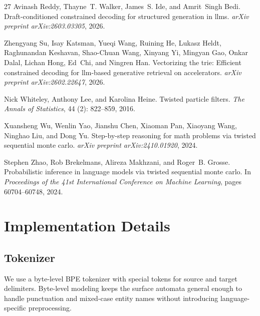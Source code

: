 \documentclass[11pt]{article}
\begin{document}
\begin{thebibliography}{27}
Avinash Reddy, Thayne~T. Walker, James~S. Ide, and Amrit~Singh Bedi.
\newblock Draft-conditioned constrained decoding for structured generation in
  llms.
\newblock \emph{arXiv preprint arXiv:2603.03305}, 2026.

Zhengyang Su, Isay Katsman, Yueqi Wang, Ruining He, Lukasz Heldt, Raghunandan
  Keshavan, Shao-Chuan Wang, Xinyang Yi, Mingyan Gao, Onkar Dalal, Lichan Hong,
  Ed~Chi, and Ningren Han.
\newblock Vectorizing the trie: Efficient constrained decoding for llm-based
  generative retrieval on accelerators.
\newblock \emph{arXiv preprint arXiv:2602.22647}, 2026.

Nick Whiteley, Anthony Lee, and Karolina Heine.
\newblock Twisted particle filters.
\newblock \emph{The Annals of Statistics}, 44 (2): 822--859,
  2016.

Xuansheng Wu, Wenlin Yao, Jianshu Chen, Xiaoman Pan, Xiaoyang Wang, Ninghao
  Liu, and Dong Yu.
\newblock Step-by-step reasoning for math problems via twisted sequential monte
  carlo.
\newblock \emph{arXiv preprint arXiv:2410.01920}, 2024.

Stephen Zhao, Rob Brekelmans, Alireza Makhzani, and Roger~B. Grosse.
\newblock Probabilistic inference in language models via twisted sequential
  monte carlo.
\newblock In \emph{Proceedings of the 41st International Conference on Machine
  Learning}, pages 60704--60748, 2024.

\end{thebibliography}

\appendix

\section{Implementation Details}
\subsection{Tokenizer}
We use a byte-level BPE tokenizer with special tokens for source and target delimiters. Byte-level modeling keeps the surface automata general enough to handle punctuation and mixed-case entity names without introducing language-specific preprocessing.
\end{document}
